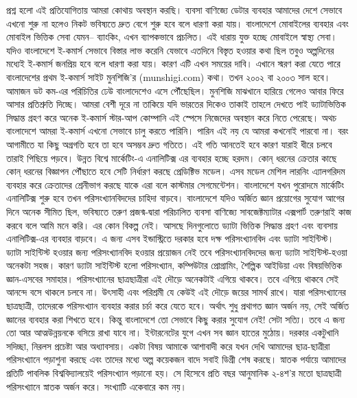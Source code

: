 \documentclass[11pt, twoside, openright, a4paper,xetex]{book}\usepackage[]{graphicx}\usepackage[]{color}
\begin{document}
প্রশ্ন হলো এই প্রতিযোগিতায় আমরা কোথায় অবস্থান করছি। ব্যবসা বাণিজ্যে ডেটার ব্যবহার আমাদের দেশে সেভাবে এখনো শুরু না হলেও নিকট ভবিষ্যতে দ্রুত বেগে শুরু হবে বলে ধারণা করা যায়। বাংলাদেশে মোবাইলের ব্যবহার এবং মোবাইল ভিত্তিক সেবা যেমন-- ব্যাংকিং, এখন ব্যাপকভাবে প্রচলিত। এই ধারায় যুক্ত হচ্ছে মোবাইলে স্বাস্থ্য সেবা।
যদিও বাংলাদেশে ই-কমার্স সেভাবে বিস্তার লাভ করেনি যেভাবে এতদিনে বিস্তৃত হওয়ার কথা ছিল তবুও অল্পদিনের মধ্যেই ই-কমার্স জনপ্রিয় হবে বলে ধারণা করা যায়। কারণ এটি এখন সময়ের দাবি।
এখানে স্মরণ করা যেতে পারে বাংলাদেশের প্রথম ই-কমার্স সাইট মুনশিজি'র (munshigi.com) কথা। তখন ২০০২ বা  ২০০৩ সাল হবে। আমাজন ডট কম-এর পরিচিতির ঢেউ বাংলাদেশেও এসে পৌঁছেছিল। মুনশিজি মাঝখানে হারিয়ে গেলেও আবার ফিরে আসার প্রতিশ্রুতি দিচ্ছে।
আমরা বেশী দূরে না তাকিয়ে যদি ভারতের দিকেও তাকাই তাহলে দেখতে পাই ড্যাটাভিত্তিক সিদ্ধান্ত গ্রহণ করে অনেক ই-কমার্স স্টার-আপ কোম্পানি এই স্পেসে নিজেদের অবস্থান করে নিতে পেরেছে। অথচ বাংলাদেশে আমরা ই-কমার্স এখনো সেভাবে চালু করতে পারিনি। পারিন  এই নয় যে আমরা কখনোই পারবো না। বরং আগামীতে যা কিছু অগ্রগতি হবে তা হবে অসম্ভব দ্রুত গতিতে। এই গতি আনতেই হবে কারণ যারাই ধীরে চলবে তারাই পিছিয়ে পড়বে।
উন্নত বিশ্বে মার্কেটিং-এ এনালিটিক্স এর ব্যবহার হচ্ছে হরদম। কোন্ ধরনের ক্রেতার কাছে কোন্ ধরনের বিজ্ঞাপন পৌঁছাতে হবে সেটি নির্ধারণ করছে প্রেডিক্টিভ মডেল। এসব মডেল মেশিল লারনিং এ্যালগরিদম ব্যবহার করে ক্রেতাদের শ্রেনীভাগ করছে যাকে এরা বলে কাস্টমার সেগমেন্টেশন। বাংলাদেশে যখন পুরোদমে মার্কেটিং এনালিটিক্স শুরু হবে তখন পরিসংখ্যানবিদদের চাহিদা বাড়বে।
বাংলাদেশে যদিও অর্জিত জ্ঞান প্রয়োগের সুযোগ আগের দিনে অনেক সীমিত ছিল, ভবিষ্যতে তরুণ প্রজন্ম-দ্বারা পরিচালিত ব্যবসা বাণিজ্যে সাবজেক্টম্যাটার এক্সপার্ট তরুণরাই কাজ করবে বলে আমি মনে করি। এর কোন বিকল্প নেই।
আসছে দিনগুলোতে ড্যাটা ভিত্তিক সিদ্ধান্ত গ্রহণ এবং ব্যবসায় এনালিটিক্স-এর ব্যবহার বাড়বে। এ জন্য এসব ইন্ডাস্ট্রিতে দরকার হবে দক্ষ পরিসংখ্যানবিদ এবং ড্যাটা সাইন্টিস্ট। ড্যাটা সাইন্টিস্ট হওয়ার জন্য পরিসংখ্যানবিদ হওয়ার প্রয়োজন নেই তবে পরিসংখ্যানবিদদের জন্য ড্যাটা সাইন্টিস্ট-হওয়া অনেকটা সহজ। কারণ ড্যাটা সাইন্টিস্ট হলো পরিসংখ্যান, কম্পিউটার প্রোগ্রামিং, শৈল্পিক আইডিয়া এবং বিষয়ভিত্তিক জ্ঞান-এসবের সমাহার।
পরিসংখ্যানের ছাত্রছাত্রীরা এই দৌড়ে অনেকটাই এগিয়ে থাকবে। তবে এগিয়ে থাকবে সেই আনন্দে বসে থাকলে চলবে না। উৎসাহী এবং পরিশ্রমী যে কেউই এই দৌড়ে জয়ের সামর্থ রাখে। যারা পরিসংখ্যানের ছাত্রছাত্রী, তাদেরকে পরিসংখ্যান ব্যবহার করার চর্চা করে যেতে হবে। অর্থাৎ শুধু প্রথাগত জ্ঞান অর্জন নয়, সেই অর্জিত জ্ঞানের ব্যবহার করা শিখতে হবে।
কিন্তু বাংলাদেশে তো সেভাবে কিছু করার সুযোগ নেই! সেটা সত্যি। তবে এ জন্য তো আর আত্মউন্নয়নকে বসিয়ে রাখা যাবে না। ইন্টারনেটের যুগে এখন সব জ্ঞান হাতের মুঠোয়। দরকার একটুখানি সদিচ্ছা, নিরলস প্রচেষ্টা আর অধ্যাবসায়।
একটা বিষয় আমাকে আশাবাদী করে যখন দেখি আমাদের ছাত্র-ছাত্রীরা পরিসংখ্যানে পড়াশুনা করছে এবং তাদের মধ্যে অল্প কয়েকজন বাদে সবাই ডিগ্রী শেষ করছে। স্নাতক পর্যায়ে আমাদের প্রতিটি পাবলিক বিশ্ববিদ্যালয়েই পরিসংখ্যান পড়ানো হয়। সে হিসেবে প্রতি বছর আনুমানিক ২-৪শ’র মতো ছাত্রছাত্রী পরিসংখ্যানে স্নাতক অর্জন করে। সংখ্যাটি একেবারে কম নয়।
\end{document}
